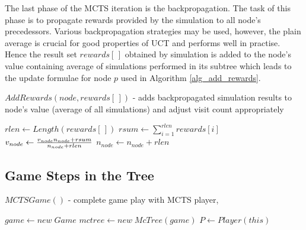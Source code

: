 The last phase of the MCTS iteration is the backpropagation. The task of this phase is to propagate
rewards provided by the simulation to all node's precedessors. Various backpropagation strategies
may be used, however, the plain average is crucial for good properties of UCT and performs
well in
practise. Hence the result set $rewards[\,]$ obtained by simulation is added to the node's value containing
average of simulations performed in its subtree which leads to the update formulae for
node $p$ used in Algorithm \ref{alg_add_rewards}.

\begin{algorithm}
\DontPrintSemicolon
\caption{$AddRewards(node,rewards[\,])$ - adds backpropagated simulation results to node's
value (average of all simulations) and adjust visit count appropriately \label{alg_add_rewards}}
$rlen \leftarrow Length(rewards[\,])$\;
$rsum \leftarrow \sum\limits_{i=1}^{rlen} rewards[i]$\;
$v_{node} \leftarrow {{v_{node} n_{node} + rsum}
    \over{n_{node} + rlen}}$\;
$n_{node} \leftarrow n_{node} + rlen$\;
\end{algorithm}


\subsection{Game Steps in the Tree}

\begin{algorithm}
\DontPrintSemicolon
\caption{$MCTSGame()$ - complete game play with MCTS player, \label{alg_mcts_game_step}}
$game \leftarrow new\;Game$\;
$mctree \leftarrow new\;McTree(game) $\;
$P \leftarrow Player(this)$\;
\end{algorithm}

